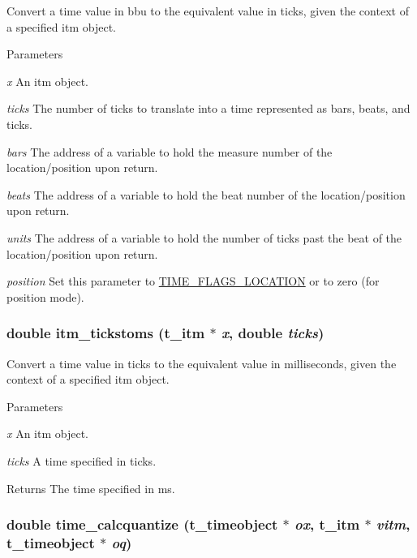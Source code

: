 Convert a time value in bbu to the equivalent value in ticks, given the context of a specified itm object. 
\begin{DoxyParams}{Parameters}
\item[{\em x}]An itm object. \item[{\em ticks}]The number of ticks to translate into a time represented as bars, beats, and ticks. \item[{\em bars}]The address of a variable to hold the measure number of the location/position upon return. \item[{\em beats}]The address of a variable to hold the beat number of the location/position upon return. \item[{\em units}]The address of a variable to hold the number of ticks past the beat of the location/position upon return. \item[{\em position}]Set this parameter to \hyperlink{group__time_gga99fb83031ce9923c84392b4e92f956b5ac80606ccbb9a16c14cf81874e4de2408}{TIME\_\-FLAGS\_\-LOCATION} or to zero (for position mode). \end{DoxyParams}
\hypertarget{group__time_ga3ed676dca6666ab9f305ea81b8d1b6b7}{
\subsubsection[{itm\_\-tickstoms}]{\setlength{\rightskip}{0pt plus 5cm}double itm\_\-tickstoms ({\bf t\_\-itm} $\ast$ {\em x}, \/  double {\em ticks})}}
\label{group__time_ga3ed676dca6666ab9f305ea81b8d1b6b7}


Convert a time value in ticks to the equivalent value in milliseconds, given the context of a specified itm object. 
\begin{DoxyParams}{Parameters}
\item[{\em x}]An itm object. \item[{\em ticks}]A time specified in ticks. \end{DoxyParams}
\begin{DoxyReturn}{Returns}
The time specified in ms. 
\end{DoxyReturn}
\hypertarget{group__time_gab5d282bae56be219c0c863a798140cb5}{
\subsubsection[{time\_\-calcquantize}]{\setlength{\rightskip}{0pt plus 5cm}double time\_\-calcquantize ({\bf t\_\-timeobject} $\ast$ {\em ox}, \/  {\bf t\_\-itm} $\ast$ {\em vitm}, \/  {\bf t\_\-timeobject} $\ast$ {\em oq})}}
\label{group__time_gab5d282bae56be219c0c863a798140cb5}


